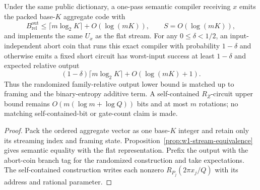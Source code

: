 \begin{proposition}
\label{prop:w1-semantic-upper}
Under the same public dictionary, a one-pass semantic compiler receiving
$x$ emits the packed base-$K$ aggregate code with
\begin{equation}
 B_{\mathrm{rel}}^{\mathrm{out}}
 \leq\lceil m\log_2K\rceil+O(\log(mK)),
 \qquad S=O(\log(mK)),
 \label{eq:w1-semantic-upper}
\end{equation}
and implements the same $U_x$ as the flat stream.  For any
$0\leq\delta<1/2$, an input-independent abort coin that runs this exact
compiler with probability $1-\delta$ and otherwise emits a fixed short
circuit has worst-input success at least $1-\delta$ and expected relative
output
\begin{equation}
 (1-\delta)\lceil m\log_2K\rceil+O(\log(mK)+1).
 \label{eq:w1-random-upper}
\end{equation}
Thus the randomized family-relative output lower bound is matched up to
framing and the binary-entropy additive term.  A self-contained
$R_Z$-circuit upper bound remains
$O(m(\log m+\log Q))$ bits and at most $m$ rotations; no matching
self-contained-bit or gate-count claim is made.
\end{proposition}

\begin{proof}
Pack the ordered aggregate vector as one base-$K$ integer and retain only
its streaming index and framing state.  Proposition~\ref{prop:w1-stream-equivalence}
gives semantic equality with the flat representation.  Prefix the output
with the abort-coin branch tag for the randomized construction and take
expectations.  The self-contained construction writes each nonzero
$R_{P_j}(2\pi x_j/Q)$ with its address and rational parameter.
\end{proof}
